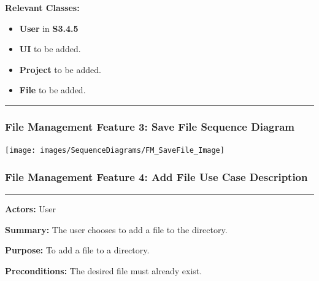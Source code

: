 \documentclass[twoside,letterpaper]{article}
\begin{document}
\noindent\textbf{Relevant Classes:}
\begin{itemize}
	\item \textbf{User} in \textbf{S3.4.5}
	\item \textbf{UI} to be added.
	\item \textbf{Project} to be added.
	\item \textbf{File} to be added.
\end{itemize}
\vspace{8pt}
\hrule

\newpage

\subsubsection[File Management Feature 3: Save File Sequence Diagram]{\rmfamily\bfseries\color{black}
	File Management Feature 3: Save File Sequence Diagram}
\hypertarget{RefHeading22059017292}{}

\texttt{[image: images/SequenceDiagrams/FM\_SaveFile\_Image]}

\newpage

\subsubsection[File Management Feature 4: Add File Use Case Description]{\rmfamily\bfseries\color{black}
	File Management Feature 4: Add File Use Case Description}
\hypertarget{RefHeading22059017292}{}

\vspace{2pt}
\hrule
\vspace{8pt}
\textbf{Actors:} User \newline

\noindent\textbf{Summary:} The user chooses to add a file to the directory. \newline

\noindent\textbf{Purpose:} To add a file to a directory. \newline

\noindent\textbf{Preconditions:} The desired file must already exist. \newline
\end{document}
